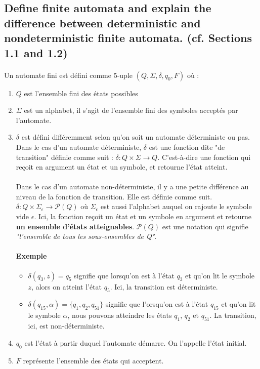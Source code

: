 \subsection{Define finite automata and explain the difference between deterministic and nondeterministic finite automata. (cf. Sections 1.1 and 1.2)}
\paragraph{}
Un automate fini est défini comme 5-uple $(Q, \Sigma, \delta, q_{0}, F)$ où :
\begin{enumerate}
\item $Q$ est l'ensemble fini des états possibles
\item $\Sigma$ est un alphabet, il s'agit de l'ensemble fini des symboles acceptés par l'automate. 
\item $\delta$ est défini différemment selon qu'on soit un automate déterministe ou pas. Dans le cas d'un automate déterministe, $\delta$ est une fonction dite "de transition" définie comme suit : $\delta : Q \times \Sigma \rightarrow Q$. C'est-à-dire une fonction qui reçoit en argument un état et un symbole, et retourne l'état atteint.
\paragraph{}
Dans le cas d'un automate non-déterministe, il y a une petite différence au niveau de la fonction de transition. Elle est définie comme suit. $\delta : Q \times \Sigma_{\epsilon} \rightarrow \mathcal{P}(Q)$ où $\Sigma_{\epsilon}$ est aussi l'alphabet auquel on rajoute le symbole vide $\epsilon$. Ici, la fonction reçoit un état et un symbole en argument et retourne \textbf{un ensemble d'états atteignables}. $\mathcal{P}(Q)$ est une notation qui signifie \textit{"l'ensemble de tous les sous-ensembles de Q"}.
\paragraph{Exemple} 
\begin{itemize}
\item $\delta(q_{3}, z) = q_{5}$ signifie que lorsqu'on est à l'état $q_{3}$ et qu'on lit le symbole $z$, alors on atteint l'état $q_{5}$. Ici, la transition est déterministe.
\item  $\delta(q_{15}, \alpha) = \{q_{1}, q_{2}, q_{51}\}$ signifie que l'orsqu'on est à l'état $q_{15}$ et qu'on lit le symbole $\alpha$, nous pouvons atteindre les états $q_{1}$, $q_{2}$ et $q_{51}$. La transition, ici, est non-déterministe. 
\end{itemize}

\item $q_{0}$ est l'état à partir duquel l'automate démarre. On l'appelle l'état initial.
\item $F$ représente l'ensemble des états qui acceptent.
\end{enumerate}

